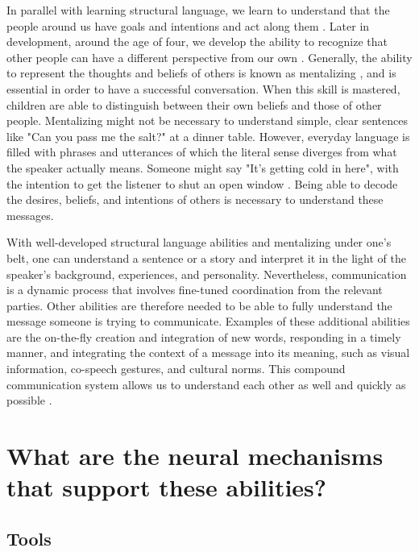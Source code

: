 In parallel with learning structural language, we learn to understand that the people around us have goals and intentions and act along them \citep{gergely2002,tomasello2003}. Later in development, around the age of four, we develop the ability to recognize that other people can have a different perspective from our own \citep{wimmer1983}. Generally, the ability to represent the thoughts and beliefs of others is known as mentalizing \citep{premack1978}, and is essential in order to have a successful conversation. When this skill is mastered, children are able to distinguish between their own beliefs and those of other people. Mentalizing might not be necessary to understand simple, clear sentences like "Can you pass me the salt?" at a dinner table. However, everyday language is filled with phrases and utterances of which the literal sense diverges from what the speaker actually means. Someone might say "It's getting cold in here", with the intention to get the listener to shut an open window \citep{vanackeren2012}. Being able to decode the desires, beliefs, and intentions of others is necessary to understand these messages.

With well-developed structural language abilities and mentalizing under one's belt, one can understand a sentence or a story and interpret it in the light of the speaker's background, experiences, and personality. Nevertheless, communication is a dynamic process that involves fine-tuned coordination from the relevant parties. Other abilities are therefore needed to be able to fully understand the message someone is trying to communicate. Examples of these additional abilities are the on-the-fly creation and integration of new words, responding in a timely manner, and integrating the context of a message into its meaning, such as visual information, co-speech gestures, and cultural norms. This compound communication system allows us to understand each other as well and quickly as possible \citep{levinson2020,levinson2024}.
 
\section{What are the neural mechanisms that support these abilities?}

\subsection{Tools}

